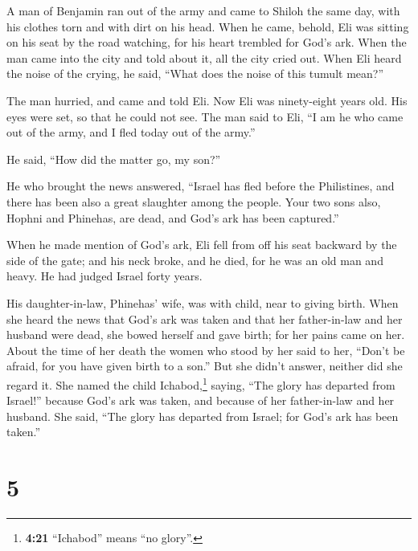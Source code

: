  A man of Benjamin ran out of the army and came to Shiloh
the same day, with his clothes torn and with dirt on his head.
 When he came, behold, Eli was sitting on his seat by the
road watching, for his heart trembled for God's ark. When the man came
into the city and told about it, all the city cried out. 
When Eli heard the noise of the crying, he said, ``What does the noise
of this tumult mean?''

The man hurried, and came and told Eli.  Now Eli was
ninety-eight years old. His eyes were set, so that he could not see.
 The man said to Eli, ``I am he who came out of the army,
and I fled today out of the army.''

He said, ``How did the matter go, my son?''

 He who brought the news answered, ``Israel has fled
before the Philistines, and there has been also a great slaughter among
the people. Your two sons also, Hophni and Phinehas, are dead, and God's
ark has been captured.''

 When he made mention of God's ark, Eli fell from off his
seat backward by the side of the gate; and his neck broke, and he died,
for he was an old man and heavy. He had judged Israel forty years.

 His daughter-in-law, Phinehas' wife, was with child,
near to giving birth. When she heard the news that God's ark was taken
and that her father-in-law and her husband were dead, she bowed herself
and gave birth; for her pains came on her.  About the
time of her death the women who stood by her said to her, ``Don't be
afraid, for you have given birth to a son.'' But she didn't answer,
neither did she regard it.  She named the child
Ichabod,\footnote{\textbf{4:21} ``Ichabod'' means ``no glory''.} saying,
``The glory has departed from Israel!'' because God's ark was taken, and
because of her father-in-law and her husband.  She said,
``The glory has departed from Israel; for God's ark has been taken.''

\hypertarget{section-4}{%
\section{5}\label{section-4}}

